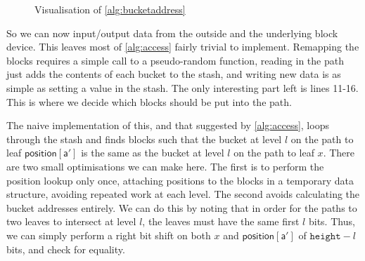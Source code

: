 \documentclass[12pt,a4paper,twoside,openright]{report}
\begin{document}
\begin{figure}[ht]
    \centering
  \caption{Visualisation of \cref{alg:bucketaddress}}
  \label{fig:bucketaddress}
\end{figure}

So we can now input/output data from the outside and the underlying block device. This leaves most of \cref{alg:access} fairly trivial to implement. Remapping the blocks requires a simple call to a pseudo-random function, reading in the path just adds the contents of each bucket to the stash, and writing new data is as simple as setting a value in the stash. The only interesting part left is lines 11-16. This is where we decide which blocks should be put into the path.

The naive implementation of this, and that suggested by \cref{alg:access}, loops through the stash and finds blocks such that the bucket at level $l$ on the path to leaf $\mathsf{position[a']}$ is the same as the bucket at level $l$ on the path to leaf $x$. There are two small optimisations we can make here. The first is to perform the position lookup only once, attaching positions to the blocks in a temporary data structure, avoiding repeated work at each level. The second avoids calculating the bucket addresses entirely. We can do this by noting that in order for the paths to two leaves to intersect at level $l$, the leaves must have the same first $l$ bits. Thus, we can simply perform a right bit shift on both $x$ and $\mathsf{position[a']}$ of $\mathtt{height} - l$ bits, and check for equality.
\end{document}
